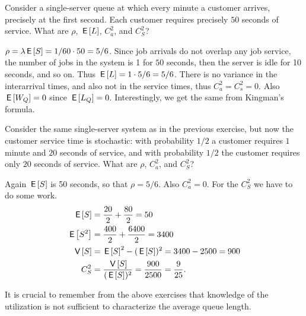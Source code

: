 \begin{exercise}
 Consider a single-server queue at which every minute a
    customer arrives, precisely at the first second. Each customer
    requires precisely $50$ seconds of service. 
What are $\rho$,
    $\,\mathsf{E}\left[L\right]$, $C_a^2$, and $C_S^2$?
  \begin{solution}
 $\rho = \lambda \,\mathsf{E}\left[S\right] = 1/60 \cdot 50 = 5/6$. Since job
      arrivals do not overlap any job service, the number of jobs in
      the system is 1 for $50$ seconds, then the server is idle for 10
      seconds, and so on. Thus $\,\mathsf{E}\left[L\right] = 1\cdot5/6 = 5/6$. There is no
      variance in the interarrival times, and also not in the service
      times, thus $C_a^2 = C_s^2 = 0$. Also $\,\mathsf{E}\left[W_Q\right]=0$ since
      $\,\mathsf{E}\left[L_Q\right]=0$. Interestingly, we get the same from Kingman's formula.
  \end{solution}
\end{exercise}

\begin{exercise}
 Consider the same single-server system as in the previous exercise, but now the customer
    service time is stochastic: with probability $1/2$ a customer
    requires $1$ minute and $20$ seconds of service, and with
    probability $1/2$ the customer requires only $20$ seconds of
    service.  What are $\rho$, $C_a^2$, and $C_S^2$?
  \begin{solution}
 Again $\,\mathsf{E}\left[S\right]$ is 50 seconds, so that $\rho = 5/6$. Also
      $C_a^2=0$. For the $C_S^2$ we have to do some work. 
      \begin{equation*}
        \begin{split}
          \,\mathsf{E}\left[S\right] &=  \frac{20}2 + \frac{80}2 = 50 \\
          \,\mathsf{E}\left[S^2\right] &=  \frac{400}2 + \frac{6400} 2 = 3400 \\
          \,\mathsf{V}\left[S\right] &=  \,\mathsf{E}\left[S\right]^2 - (\,\mathsf{E}\left[S\right])^2 = 3400 - 2500 = 900 \\
          C_S^2 &=  \frac{\,\mathsf{V}\left[S\right]}{(\,\mathsf{E}\left[S\right])^2} = \frac{900}{2500}=\frac{9}{25}.
        \end{split}
      \end{equation*}
  \end{solution}
\end{exercise}

It is crucial to remember from the above exercises that knowledge of the   utilization is not sufficient to characterize the average queue   length.


